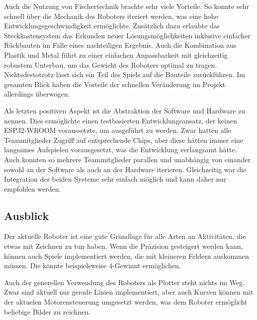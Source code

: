 \documentclass[conference,compsoc,final,a4paper]{IEEEtran}
\begin{document}
Auch die Nutzung von Fischertechnik brachte sehr viele Vorteile. So konnte sehr schnell über die Mechanik des Roboters iteriert werden,
was eine hohe Entwicklungsgeschwindigkeit ermöglichte. Zusätzlich dazu erlaubte das Steckkastensystem das Erkunden neuer Lösungsmöglichkeiten
inklusive einfacher Rückbauten im Falle eines nachteiligen Ergebnis. Auch die Kombination aus Plastik und Metal führt zu einer einfachen 
Anpassbarkeit mit gleichzeitig robustem Unterbau, um das Gewicht des Roboters optimal zu tragen. Nichtsdestotrotz lässt sich ein Teil des
Spiels auf die Bauteile zurückführen. Im gesamten Blick haben die Vorteile der schnellen Veränderung im Projekt allerdings überwogen.

Als letzten positiven Aspekt ist die Abstraktion der Software und Hardware zu nennen. Dies ermöglichte einen testbasierten
Entwicklungsansatz, der keinen ESP32-WROOM voraussetzte, um ausgeführt zu werden. Zwar hatten alle Teammitglieder Zugriff auf entsprechende
Chips, aber diese hätten immer eine langsames Aufspielen vorausgesetzt, was die Entwicklung verlangsamt hätte. Auch konnten so mehrere
Teammitglieder parallen und unabhängig von einander sowohl an der Software als auch an der Hardware iterieren. Gleichzeitig war die
Integration der beiden Systeme sehr einfach möglich und kann daher nur empfohlen werden.

\subsection{Ausblick}

Der aktuelle Roboter ist eine gute Grundlage für alle Arten an Aktivitäten, die etwas mit Zeichnen zu tun haben. Wenn die Präzision
gesteigert werden kann, können auch Spiele implementiert werden, die mit kleineren Feldern auskommen müssen. Die könnte beispielsweise
4-Gewinnt ermöglichen.

Auch der generellen Verwendung des Roboters als Plotter steht nichts im Weg. Zwar sind aktuell nur gerade Linien implementiert, aber
auch Kurven können mit der aktuelen Motorensteuerung umgesetzt werden, was dem Roboter ermöglicht beliebige Bilder zu zeichnen.

\printbibliography
\end{document}
